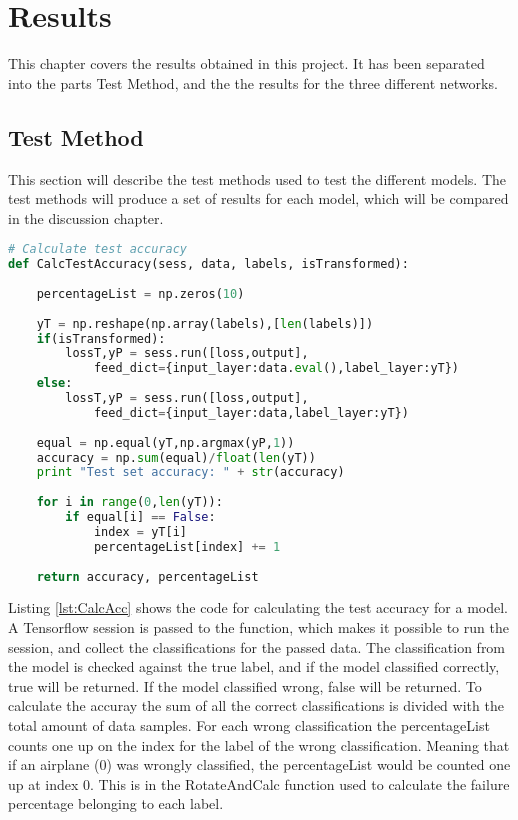 \chapter{Results}
\label{chp:results}

This chapter covers the results obtained in this project. It has been separated into the parts Test Method, and the the results for the three different networks.

\section{Test Method}

This section will describe the test methods used to test the different models. The test methods will produce a set of results for each model, which will be compared in the discussion chapter.

\begin{lstlisting}[language=Python, label=lst:CalcAcc, caption=Function to calculate the test accuracy for a model]
# Calculate test accuracy
def CalcTestAccuracy(sess, data, labels, isTransformed):
    
    percentageList = np.zeros(10)
    
    yT = np.reshape(np.array(labels),[len(labels)])
    if(isTransformed):
        lossT,yP = sess.run([loss,output],
        	feed_dict={input_layer:data.eval(),label_layer:yT})
    else:
        lossT,yP = sess.run([loss,output],
        	feed_dict={input_layer:data,label_layer:yT})
    
    equal = np.equal(yT,np.argmax(yP,1))
    accuracy = np.sum(equal)/float(len(yT))
    print "Test set accuracy: " + str(accuracy)
    
    for i in range(0,len(yT)):
        if equal[i] == False:
            index = yT[i]
            percentageList[index] += 1
    
    return accuracy, percentageList
\end{lstlisting}

Listing \ref{lst:CalcAcc} shows the code for calculating the test accuracy for a model. A Tensorflow session is passed to the function, which makes it possible to run the session, and collect the classifications for the passed data. The classification from the model is checked against the true label, and if the model classified correctly, true will be returned. If the model classified wrong, false will be returned. To calculate the accuray the sum of all the correct classifications is divided with the total amount of data samples. For each wrong classification the percentageList counts one up on the index for the label of the wrong classification. Meaning that if an airplane (0) was wrongly classified, the percentageList would be counted one up at index 0. This is in the RotateAndCalc function used to calculate the failure percentage belonging to each label.

